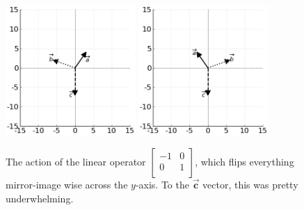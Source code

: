 \begin{figure}[ht]
\centering
\vspace{.2in}
\includegraphics[width=0.44\textwidth]{preoperators.png}
\includegraphics[width=0.44\textwidth]{horizFlipOp.png}
\caption[.]{The action of the linear operator 
{\scriptsize $\begin{bmatrix} -1 & 0 \\ 0 & 1 \\
\end{bmatrix}$,} which flips everything mirror-image wise across the $y$-axis.
To the $\overrightarrow{\textbf{c}}$ vector, this was pretty underwhelming.}
\label{fig:horizFlipOp}
\end{figure}

